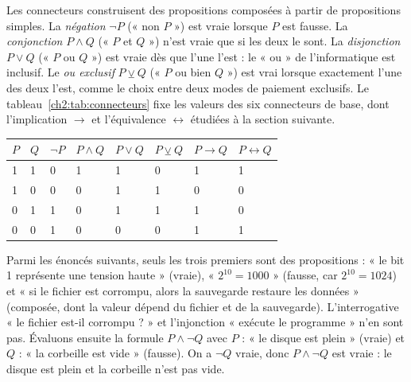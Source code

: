 Les connecteurs construisent des propositions composées à partir de propositions simples. La \emph{négation} $\lnot P$ (« non $P$ ») est vraie lorsque $P$ est fausse. La \emph{conjonction} $P \land Q$ (« $P$ et $Q$ ») n'est vraie que si les deux le sont. La \emph{disjonction} $P \lor Q$ (« $P$ ou $Q$ ») est vraie dès que l'une l'est : le « ou » de l'informatique est inclusif. Le \emph{ou exclusif} $P \veebar Q$ (« $P$ ou bien $Q$ ») est vrai lorsque exactement l'une des deux l'est, comme le choix entre deux modes de paiement exclusifs. Le tableau~\ref{ch2:tab:connecteurs} fixe les valeurs des six connecteurs de base, dont l'implication $\rightarrow$ et l'équivalence $\leftrightarrow$ étudiées à la section suivante.

\begin{center}
\small
\begin{tabular}{C{0.75cm}C{0.75cm}C{0.95cm}C{1.15cm}C{1.05cm}C{1.15cm}C{1.35cm}C{1.55cm}}
\toprule
{}$P$ & $Q$ & $\lnot P$ & $P \land Q$ & $P \lor Q$ & $P \veebar Q$ & $P \rightarrow Q$ & $P \leftrightarrow Q$\\
 & 1 & 0 & 1 & 1 & 0 & 1 & 1\\
1 & 0 & 0 & 0 & 1 & 1 & 0 & 0\\
0 & 1 & 1 & 0 & 1 & 1 & 1 & 0\\
0 & 0 & 1 & 0 & 0 & 0 & 1 & 1\\
\bottomrule
\end{tabular}
\label{ch2:tab:connecteurs}
\end{center}

\begin{exemple}
Parmi les énoncés suivants, seuls les trois premiers sont des propositions : « le bit 1 représente une tension haute » (vraie), « $2^{10} = 1000$ » (fausse, car $2^{10} = 1024$) et « si le fichier est corrompu, alors la sauvegarde restaure les données » (composée, dont la valeur dépend du fichier et de la sauvegarde). L'interrogative « le fichier est-il corrompu ? » et l'injonction « exécute le programme » n'en sont pas. Évaluons ensuite la formule $P \land \lnot Q$ avec $P$ : « le disque est plein » (vraie) et $Q$ : « la corbeille est vide » (fausse). On a $\lnot Q$ vraie, donc $P \land \lnot Q$ est vraie : le disque est plein et la corbeille n'est pas vide.
\end{exemple}

